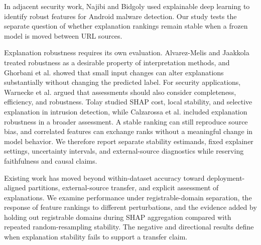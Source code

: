 \documentclass[
  10pt,
]{article}
\begin{document}
In adjacent security work, Najibi and Bidgoly\citep{Najibi2025JISA} used
explainable deep learning to identify robust features for Android
malware detection. Our study tests the separate question of whether
explanation rankings remain stable when a frozen model is moved between
URL sources.

Explanation robustness requires its own evaluation. Alvarez-Melis and
Jaakkola\citep{AlvarezMelis2018} treated robustness as a desirable
property of interpretation methods, and Ghorbani et
al.\citep{Ghorbani2019} showed that small input changes can alter
explanations substantially without changing the predicted label. For
security applications, Warnecke et al.\citep{Warnecke2020} argued that
assessments should also consider completeness, efficiency, and
robustness. Tolay\citep{Tolay2026} studied SHAP cost, local stability,
and selective explanation in intrusion detection, while Calzarossa et
al.\citep{Calzarossa2025Robust, Calzarossa2025Framework} included
explanation robustness in a broader assessment. A stable ranking can
still reproduce source bias, and correlated features can exchange ranks
without a meaningful change in model behavior. We therefore report
separate stability estimands, fixed explainer settings, uncertainty
intervals, and external-source diagnostics while reserving faithfulness
and causal claims.

Existing work has moved beyond within-dataset accuracy toward
deployment-aligned partitions, external-source transfer, and explicit
assessment of explanations. We examine performance under
registrable-domain separation, the response of feature rankings to
different perturbations, and the evidence added by holding out
registrable domains during SHAP aggregation compared with repeated
random-resampling stability. The negative and directional results define
when explanation stability fails to support a transfer claim.
\end{document}

